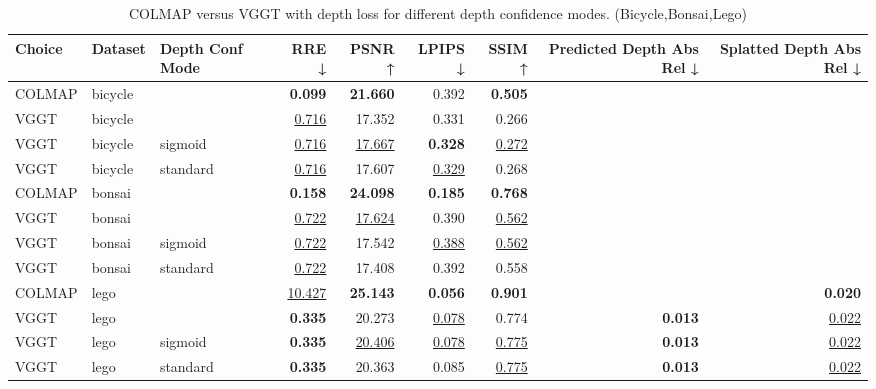 \begin{table}[H]
\caption{COLMAP versus VGGT with depth loss for different depth confidence modes. (Bicycle,Bonsai,Lego)}
\label{tab:05_depth_conf_mode_bicycle,bonsai,lego}
\small
\begin{tabular}{lllrrrrrr}
\toprule
Choice & Dataset & Depth Conf Mode & RRE ↓ & PSNR ↑ & LPIPS ↓ & SSIM ↑ & Predicted Depth Abs Rel ↓ & Splatted Depth Abs Rel ↓ \\
\midrule
COLMAP & bicycle &  & \textbf{0.099} & \textbf{21.660} & 0.392 & \textbf{0.505} &  &  \\
VGGT & bicycle &  & \underline{0.716} & 17.352 & 0.331 & 0.266 &  &  \\
VGGT & bicycle & sigmoid & \underline{0.716} & \underline{17.667} & \textbf{0.328} & \underline{0.272} &  &  \\
VGGT & bicycle & standard & \underline{0.716} & 17.607 & \underline{0.329} & 0.268 &  &  \\
\midrule
COLMAP & bonsai &  & \textbf{0.158} & \textbf{24.098} & \textbf{0.185} & \textbf{0.768} &  &  \\
VGGT & bonsai &  & \underline{0.722} & \underline{17.624} & 0.390 & \underline{0.562} &  &  \\
VGGT & bonsai & sigmoid & \underline{0.722} & 17.542 & \underline{0.388} & \underline{0.562} &  &  \\
VGGT & bonsai & standard & \underline{0.722} & 17.408 & 0.392 & 0.558 &  &  \\
\midrule
COLMAP & lego &  & \underline{10.427} & \textbf{25.143} & \textbf{0.056} & \textbf{0.901} &  & \textbf{0.020} \\
VGGT & lego &  & \textbf{0.335} & 20.273 & \underline{0.078} & 0.774 & \textbf{0.013} & \underline{0.022} \\
VGGT & lego & sigmoid & \textbf{0.335} & \underline{20.406} & \underline{0.078} & \underline{0.775} & \textbf{0.013} & \underline{0.022} \\
VGGT & lego & standard & \textbf{0.335} & 20.363 & 0.085 & \underline{0.775} & \textbf{0.013} & \underline{0.022} \\
\bottomrule
\end{tabular}
\end{table}
